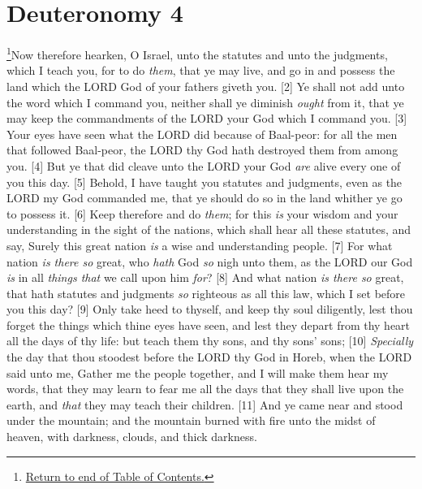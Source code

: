 \chapter{Deuteronomy 4}
\footnote{\textcolor[rgb]{0.00,0.25,0.00}{\hyperlink{DeuteronomyTOC}{Return to end of Table of Contents.}}}\textcolor[rgb]{0.00,0.00,1.00}{Now therefore hearken, O Israel, unto the statutes and unto the judgments, which I teach you, for to do \emph{them}, that ye may live, and go in and possess the land which the LORD God of your fathers giveth you.}
[2] \textcolor[rgb]{0.00,0.00,1.00}{Ye shall not add unto the word which I command you, neither shall ye diminish \emph{ought} from it, that ye may keep the commandments of the LORD your God which I command you.}
[3] \textcolor[rgb]{0.00,0.00,1.00}{Your eyes have seen what the LORD did because of Baal-peor: for all the men that followed Baal-peor, the LORD thy God hath destroyed them from among you.}
[4] \textcolor[rgb]{0.00,0.00,1.00}{But ye that did cleave unto the LORD your God \emph{are} alive every one of you this day.}
[5] \textcolor[rgb]{0.00,0.00,1.00}{Behold, I have taught you statutes and judgments, even as the LORD my God commanded me, that ye should do so in the land whither ye go to possess it.}
[6] \textcolor[rgb]{0.00,0.00,1.00}{Keep therefore and do \emph{them}; for this \emph{is} your wisdom and your understanding in the sight of the nations, which shall hear all these statutes, and say, Surely this great nation \emph{is} a wise and understanding people.}
[7] \textcolor[rgb]{0.00,0.00,1.00}{For what nation \emph{is there so} great, who \emph{hath} God \emph{so} nigh unto them, as the LORD our God \emph{is} in all \emph{things that} we call upon him \emph{for}?}
[8] \textcolor[rgb]{0.00,0.00,1.00}{And what nation \emph{is there so} great, that hath statutes and judgments \emph{so} righteous as all this law, which I set before you this day?}
[9] \textcolor[rgb]{0.00,0.00,1.00}{Only take heed to thyself, and keep thy soul diligently, lest thou forget the things which thine eyes have seen, and lest they depart from thy heart all the days of thy life: but teach them thy sons, and thy sons' sons;}
[10] \textcolor[rgb]{0.00,0.00,1.00}{\emph{Specially} the day that thou stoodest before the LORD thy God in Horeb, when the LORD said unto me, Gather me the people together, and I will make them hear my words, that they may learn to fear me all the days that they shall live upon the earth, and \emph{that} they may teach their children.}
[11] \textcolor[rgb]{0.00,0.00,1.00}{And ye came near and stood under the mountain; and the mountain burned with fire unto the midst of heaven, with darkness, clouds, and thick darkness.}
